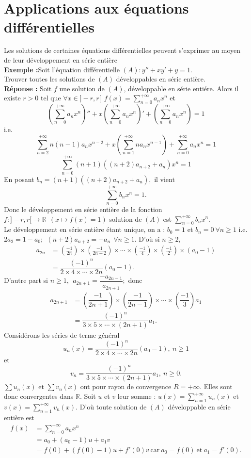 \documentclass[11pt, a4paper]{book}
\begin{document}
\section{Applications aux \'equations diff\'erentielles} 
Les solutions de certaines \'equations diff\'erentielles peuvent s'exprimer au moyen de leur d\'eveloppement en s\'erie enti\`ere\\
\textbf{Exemple :}\quad Soit l'\'equation diff\'erentielle $(A):y''+xy'+y=1.$\\
Trouver toutes les solutions de $(A)$ d\'eveloppables en s\'erie enti\`ere.\\
\textbf{R\'eponse :} Soit $f$ une solution de $(A)$, d\'eveloppable en s\'erie enti\'ere. Alors il existe $r>0$ tel que $\forall x\in ]-r,r[~~{\displaystyle f(x)=\sum_{n=0}^{+\infty}a_nx^n}$ et $$\left(\sum_{n=0}^{+\infty}a_nx^n\right)''+x\left(\sum_{n=0}^{+\infty}a_nx^n\right)'+\left(\sum_{n=0}^{+\infty}a_nx^n\right)=1$$ i.e. $$\sum_{n=2}^{+\infty}n(n-1)a_nx^{n-2}+x\left(\sum_{n=1}^{+\infty}na_nx^{n-1}\right)+\sum_{n=0}^{+\infty}a_nx^n=1$$
$$\sum_{n=0}^{+\infty}(n+1)\left((n+2)a_{n+2}+a_n\right)x^n=1$$
En posant $b_n=(n+1)\left((n+2)a_{n+2}+a_n\right),$ il vient $$\sum_{n=0}^{+\infty}b_nx^n=1.$$ Donc le d\'eveloppement en s\'erie enti\`ere de la fonction $f:]-r,r[\rightarrow\mathbb{R}~~(x\mapsto f(x)=1)$ solution de $(A)$ est ${\displaystyle\sum_{n=0}^{+\infty}b_nx^n.}$\\ Le d\'eveloppement en s\'erie enti\`ere \'etant unique, on a : $b_0=1$ et $b_n=0 ~\forall n\geq1$ i.e. $2a_2=1-a_0;~~(n+2)a_{n+2}=-a_n~~\forall n\geq 1. $ D'o\`u si $n\geq2,$ \begin{align*}
a_{2n}&=\left(\frac{-1}{2n}\right)\times\left(\frac{-1}{2n-2}\right)\times\cdots\times\left(\frac{-1}{4}\right)\times\left(\frac{-1}{2}\right)\times\left(a_0-1\right)\\&=\dfrac{(-1)^n}{2\times4\times\cdots\times2n}(a_0-1).
\end{align*}
D'autre part si $n\geq1,~~a_{2n+1}=\dfrac{-a_{2n-1}}{a_{2n+1}};$ donc \begin{align*}
a_{2n+1}&=\left(\dfrac{-1}{2n+1}\right)\times\left(\dfrac{-1}{2n-1}\right)\times\cdots\times\left(\dfrac{-1}{3}\right)a_1\\&=\dfrac{(-1)^n}{3\times5\times\cdots\times(2n+1)}a_1.
\end{align*}
Consid\'erons les s\'eries de terme g\'en\'eral $$u_n(x)=\dfrac{(-1)^n}{2\times4\times\cdots\times2n}(a_0-1),~n\geq1$$ et $$v_n=\dfrac{(-1)^n}{3\times5\times\cdots\times(2n+1)}a_1, ~n\geq0.$$
$\sum u_n(x)$ et $\sum v_n(x)$ ont pour rayon de convergence $R=+\infty.$ Elles sont donc convergentes dans $\mathbb{R}$. Soit $u$ et $v$ leur somme : ${\displaystyle u(x)=\sum_{n=1}^{+\infty}u_n(x)}$ et ${\displaystyle v(x)=\sum_{n=1}^{+\infty}v_n(x)}.$ D'o\`u toute solution de $(A)$ d\'eveloppable en s\'erie enti\`ere est \begin{align*}
f(x)&=\sum_{n=0}^{+\infty}a_nx^n\\&= a_0 +(a_0-1)u+a_1v\\&=f(0)+\left(f(0)-1\right)u+f'(0)v~\text{car}~a_0=f(0)~\text{et}~a_1=f'(0).
\end{align*}
\end{document}

